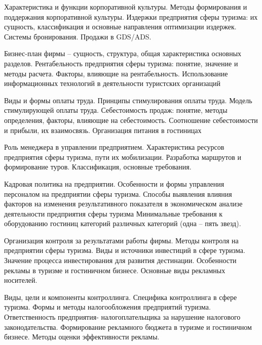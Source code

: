 \documentclass[
	11pt,
	a4paper,
	]
	{article}
\begin{document}
\noindent{} 
	{
		Характеристика и функции корпоративной культуры. Методы формирования и поддержания корпоративной культуры.
	}{
		Издержки предприятия сферы туризма: их сущность, классификация и основные направления оптимизации издержек.
	}{
		Системы бронирования. Продажи в GDS/ADS.
	}

\bigskip

\noindent{} 
	{
		Бизнес-план фирмы – сущность, структура, общая характеристика основных разделов.
	}{
		Рентабельность предприятия сферы туризма: понятие, значение и методы расчета. Факторы, влияющие на рентабельность.
	}{
		Использование информационных технологий в деятельности туристских организаций
	}

\bigskip

\noindent{} 
	{
		Виды и формы оплаты труда. Принципы стимулирования оплаты труда. Модель стимулирующей оплаты труда.
	}{
		Себестоимость продаж: понятие, методы определения, факторы, влияющие на себестоимость. Соотношение себестоимости и прибыли, их взаимосвязь.
	}{
		Организация питания в гостиницах
	}

\bigskip

\noindent{} 
	{
		Роль менеджера в управлении предприятием.
	}{
		Характеристика ресурсов предприятия сферы туризма, пути их мобилизации.
	}{
		Разработка маршрутов и формирование туров. Классификация, основные требования.
	}

\bigskip

\noindent{} 
	{
		Кадровая политика на предприятии. Особенности и формы управления персоналом на предприятии сферы туризма.
	}{
		Способы выявления влияния факторов на изменения результативного показателя в экономическом анализе деятельности предприятия сферы туризма
	}{
		Минимальные требования к оборудованию гостиниц категорий различных категорий (одна – пять звезд).
	}

\bigskip

\noindent{} 
	{
		Организация контроля за результатами работы фирмы. Методы контроля на предприятии сферы туризма.
	}{
		Виды и источники инвестиций в сфере туризма. Значение процесса инвестирования для развития дестинации.
	}{
		Особенности рекламы в туризме и гостиничном бизнесе. Основные виды рекламных носителей.
	}

\bigskip

\noindent{} 
	{
		Виды, цели и компоненты контроллинга. Специфика контроллинга в сфере туризма.
	}{
		Формы и методы налогообложения предприятий туризма. Ответственность предприятия- налогоплательщика за нарушение налогового законодательства.
	}{
		Формирование рекламного бюджета в туризме и гостиничном бизнесе. Методы оценки эффективности рекламы.
	}
\end{document}
